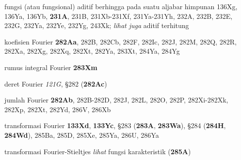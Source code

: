 fungsi (atau fungsional) aditif berhingga pada suatu aljabar himpunan 136Xg, 136Ya,
136Yb,
  {\bf 231A}, 231B, 231Xb-231Xf, 
231Ya-231Yh, 
232A, 232B, 232E, 232G, 232Ya, 232Ye, 232Yg, 243Xk; 
  {\it lihat juga} aditif terhitung
  




























































koefisien Fourier {\bf 282Aa}, 282B, 282Cb, 282F, 282Ic, 282J,
282M, 282Q, 282R, 282Xa, 282Xg, 282Xq, 282Xt, 282Ya, 283Xt, 284Ya, 284Yg


rumus integral Fourier {\bf 283Xm}


deret Fourier {\it 121G}, \S282 ({\bf 282Ac})

jumlah Fourier {\bf 282Ab}, 282B-282D, 
282J, 282L, 282O, 282P, 282Xi-282Xk, 
282Xp, 282Xt, 282Yd, 286V, 286Xb


transformasi Fourier {\bf 133Xd}, {\bf 133Yc},
  \S283 ({\bf 283A}, {\bf 283Wa}), \S284 ({\bf 284H}, {\bf 284Wd}),
285Ba, 285D, 285Xe, 285Ya, 286U, 286Ya


transformasi Fourier-Stieltjes 
  {\it lihat} fungsi karakteristik ({\bf 285A})












